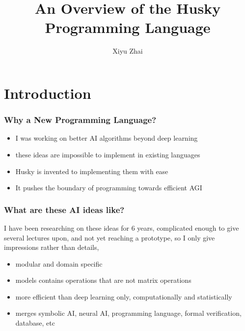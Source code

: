 \documentclass{beamer}   	%
\title{An Overview of the Husky Programming Language}
\author{Xiyu Zhai}
\date{}							%
\theoremstyle{definition}
\begin{document}
\maketitle

\section{Introduction}

\begin{frame}
\frametitle{Why a New Programming Language?}
\begin{itemize}
	\item I was working on better AI algorithms beyond deep learning
	\item these ideas are impossible to implement in existing languages
	\item Husky is invented to implementing them with ease
	\item It pushes the boundary of programming towards efficient AGI
\end{itemize}
\begin{center}
\end{center}
\end{frame}

\begin{frame}
\frametitle{What are these AI ideas like?}
I have been researching on these ideas for 6 years, complicated enough to give several lectures upon, and not yet reaching a prototype, so I only give impressions rather than details,
\begin{itemize}
	\item modular and domain specific
	\item models contains operations that are not matrix operations
	\item more efficient than deep learning only, computationally and statistically
	\item merges symbolic AI, neural AI, programming language, formal verification, database, etc
\end{itemize}
\end{frame}
\end{document}
